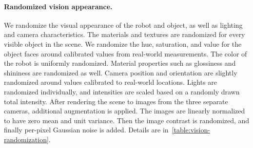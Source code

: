 \paragraph{Randomized vision appearance.} 
We randomize the visual appearance of the robot and object, as well as lighting and camera characteristics.
The materials and textures are randomized for every visible object in the scene.
We randomize the hue, saturation, and value for the object faces around calibrated values from real-world measurements.
The color of the robot is uniformly randomized. Material properties such as glossiness and shininess are randomized as well. Camera position and orientation are slightly randomized around values calibrated to real-world locations.
Lights are randomized individually, and intensities are scaled based on a randomly drawn total intensity. After rendering the scene to images from the three separate cameras, additional augmentation is applied.
The images are linearly normalized to have zero mean and unit variance.
Then the image contrast is randomized, and finally per-pixel Gaussian noise is added. Details are in~\autoref{table:vision-randomization}.

